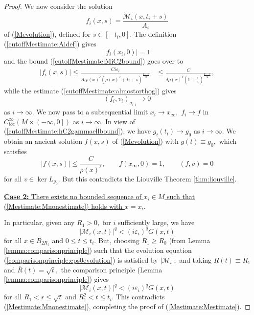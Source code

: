 \documentclass[12pt]{amsart}
\newcommand{\calM}{\mathcal{M}}
\newcommand{\LB}{\left[}
\newcommand{\RB}{\right]}
\renewcommand{\1}{{\mathbf 1}}
\newcommand{\eps}{{\varepsilon}}
\theoremstyle{others}
\numberwithin{equation}{section}
\begin{document}
\begin{proof}
    We now consider the solution
    $$f_i(x,s) = \frac{\tilde{\calM}_i(x, t_i + s)}{A_i}$$
    of (\ref{Mevolution}), defined for $s \in \LB - t_i, 0 \RB.$ The definition (\ref{cutoffMestimate:Aidef}) gives
    \begin{equation}
|f_i(x_i, 0)| = 1
    \end{equation}
    and the bound (\ref{cutoffMestimate:MiC2bound}) goes over to
    \begin{equation}
    \begin{split}
        | f_i(x,s) | \leq \frac{C i \eps_i}{A_i \rho(x)^{\ell}(\rho(x)^2 + t_i + s)^{\frac{k - \ell}{2}} } %
        & \leq \frac{C}{d \rho(x)^{\ell} \left(1 + \frac{s}{t_i} \right)^{\frac{k - \ell}{2}} },
        \end{split}
    \end{equation}
    while the estimate (\ref{cutoffMestimate:almostorthog}) gives
    \begin{equation}
    \left( f_i, v_i \right)_{g_{1,i}} \to 0
    \end{equation}
    as $i \to \infty.$ We now pass to a subsequential limit $x_i \to x_\infty,$ $f_i \to f$ in $C^\infty_{loc} \left( M \times \left( -\infty, 0 \RB \right)$ as $i \to \infty.$ In view of (\ref{cutoffMestimate:hC2gammaellbound}), we have $g_i(t_i) \to g_0$ as $i \to \infty.$ We obtain an ancient solution $f(x,s)$ of (\ref{Mevolution}) with $g(t) \equiv g_0,$ which satisfies
    \begin{equation}
        | f(x,s) | \leq \frac{C}{\rho(x)^{\ell} }, \qquad f(x_\infty, 0) = 1, \qquad
    \left( f, v \right) = 0
    \end{equation}
    for all $v \in \ker L_{g_0}.$ But this contradicts the Liouville Theorem \ref{thm:liouville}.

    \vspace{2mm}

    \noindent   \underline{ {\bf Case 2:} There exists no bounded sequence of $x_i \in M$ such that (\ref{Mestimate:Mnonestimate}) holds with $x = x_i.$}

In particular, given any $R_1 > 0,$ for $i$ sufficiently large, we have
\begin{equation}
| \calM_i(x,t) |^q < (i \eps_i)^q G(x,t)
\end{equation}
for all $x \in \bar{B}_{2R_1}$ and $0 \leq t \leq t_i.$ But, choosing $R_1 \geq R_0$ (from Lemma \ref{lemma:comparisonprinciple}) such that the evolution equation (\ref{comparisonprinciple:eps0evolution}) is satisfied by $|\calM_i|,$ and taking $\underline{R}(t) \equiv R_1$ and $\overline{R}(t) = \sqrt{t},$ the comparison principle (Lemma \ref{lemma:comparisonprinciple}) gives
\begin{equation}
| \calM_i(x,t) |^q < (i \eps_i)^q G(x,t)
\end{equation}
for all $R_1 < r \leq \sqrt{t}$ and $R_1^2 < t \leq t_i.$ This contradicts (\ref{Mestimate:Mnonestimate}), completing the proof of (\ref{Mestimate:Mestimate}).



\end{proof}
\end{document}

